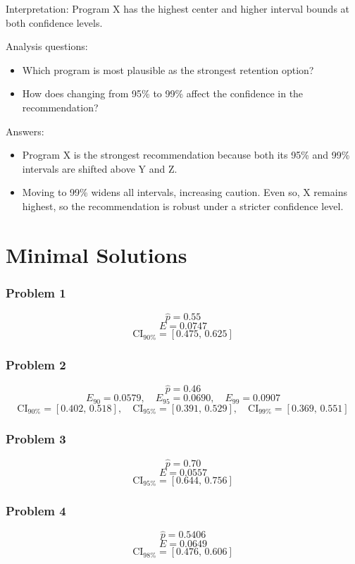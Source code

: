 	Interpretation: Program X has the highest center and higher interval bounds at both confidence levels.
	
	Analysis questions:
	\begin{itemize}
		\item Which program is most plausible as the strongest retention option?
		\item How does changing from 95\% to 99\% affect the confidence in the recommendation?
	\end{itemize}
	
	Answers:
	\begin{itemize}
		\item Program X is the strongest recommendation because both its 95\% and 99\% intervals are shifted above Y and Z.
		\item Moving to 99\% widens all intervals, increasing caution. Even so, X remains highest, so the recommendation is robust under a stricter confidence level.
	\end{itemize}
	
	\part{Minimal Solutions}
	\section*{Problem 1}
	\[
	\hat p = 0.55
	\]
	\[
	E = 0.0747
	\]
	\[
	\text{CI}_{90\%}=[0.475,\,0.625]
	\]
	
	\section*{Problem 2}
	\[
	\hat p = 0.46
	\]
	\[
	E_{90}=0.0579,\quad E_{95}=0.0690,\quad E_{99}=0.0907
	\]
	\[
	\text{CI}_{90\%}=[0.402,\,0.518],\quad \text{CI}_{95\%}=[0.391,\,0.529],\quad \text{CI}_{99\%}=[0.369,\,0.551]
	\]
	
	\section*{Problem 3}
	\[
	\hat p = 0.70
	\]
	\[
	E = 0.0557
	\]
	\[
	\text{CI}_{95\%}=[0.644,\,0.756]
	\]
	
	\section*{Problem 4}
	\[
	\hat p = 0.5406
	\]
	\[
	E = 0.0649
	\]
	\[
	\text{CI}_{98\%}=[0.476,\,0.606]
	\]
	
